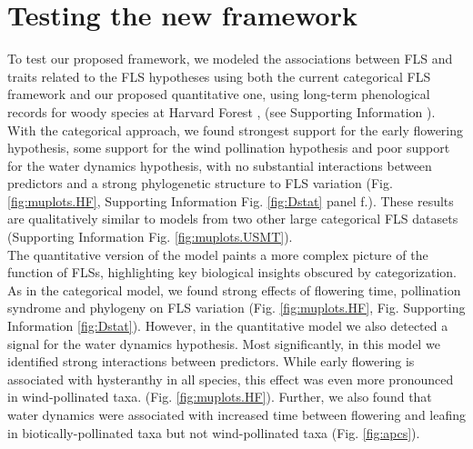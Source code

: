 \documentclass[12pt]{article}
\begin{document}
\section*{Testing the new framework}

To test our proposed framework, we modeled the associations between FLS and traits related to the FLS hypotheses using both the current categorical FLS framework and our proposed quantitative one, using long-term phenological records for woody species at Harvard Forest \citep{OKeefe2015}, (see Supporting Information ). With the categorical approach, we found strongest support for the early flowering hypothesis, some support for the wind pollination hypothesis and poor support for the water dynamics hypothesis, with no substantial interactions between predictors and a strong phylogenetic structure to FLS variation (Fig. \ref{fig:muplots.HF}, Supporting Information Fig.  \ref{fig:Dstat} panel f.). These results are qualitatively similar to models from two other large categorical FLS datasets (Supporting Information Fig. \ref{fig:muplots.USMT}). \\

\noindent The quantitative version of the model paints a more complex picture of the function of FLSs, highlighting key biological insights obscured by categorization. As in the categorical model, we found strong effects of flowering time, pollination syndrome and phylogeny on FLS variation (Fig. \ref{fig:muplots.HF}, Fig. Supporting Information \ref{fig:Dstat}). However, in the quantitative model we also detected a signal for the water dynamics hypothesis. %
Most significantly, in this model we identified strong interactions between predictors. While early flowering is associated with hysteranthy in all species, this effect was even more pronounced in wind-pollinated taxa. (Fig. \ref{fig:muplots.HF}). Further, we also found that water dynamics were associated with increased time between flowering and leafing in biotically-pollinated taxa but not wind-pollinated taxa (Fig. \ref{fig:apcs}). \\ 
\end{document}
